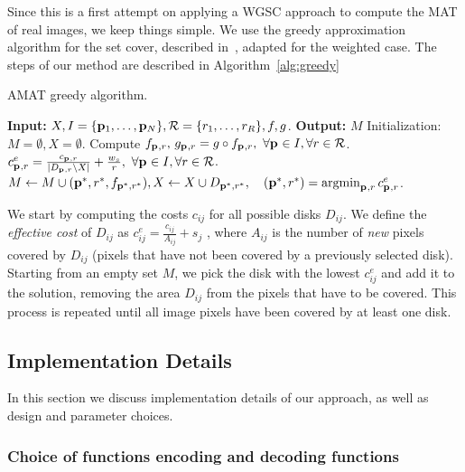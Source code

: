 \documentclass[10pt,twocolumn,letterpaper]{article}
\begin{document}
Since this is a first attempt on applying a WGSC approach to compute the MAT of real images, we keep things simple.
We use the greedy approximation algorithm for the set cover, described in~\cite{vazirani2013approximation},
adapted for the weighted case.
The steps of our method are described in Algorithm~\ref{alg:greedy}
\begin{algorithm}
\caption{AMAT greedy algorithm.}
\label{alg:greedy}
	\begin{algorithmic}[1]
	\Statex \textbf{Input:} $X,I=\{\mathbf{p}_{1},\ldots,\mathbf{p}_{N}\},\mathcal{R}=\{r_1,\ldots,r_R\},f,g$.
	\Statex \textbf{Output:} $M$
	\State Initialization: $M = \emptyset,X=\emptyset$.
	\State Compute $f_{\mathbf{p}_{},r},\, g_{\mathbf{p}_{},r} = g \circ f_{\mathbf{p}_{},r},\,\, \forall \mathbf{p}_{} \in I, \forall r \in \mathcal{R}$.
		\State $c_{\mathbf{p}_{},r}^e = \frac{c_{\mathbf{p}_{},r}}{|D_{\mathbf{p}_{},r} \setminus X|}+\frac{w_s}{r},\,\, \forall \mathbf{p}_{} \in I, \forall r \in \mathcal{R}$.		
		\State $M\leftarrow M\cup{(\p{}^{*},r^{*},f_{\p{}^{*},r^{*}})},  \newline
				X \leftarrow X\cup D_{\p{}^{*},r^{*}}, \quad (\p{}^{*},r^{*}) = \argmin_{\p{},r}{c_{\p{},r}^e}$.		
	\EndWhile
	\end{algorithmic}
\end{algorithm}
We start by computing the costs $c_{ij}$ for all possible disks $D_{ij}$.
We define the \emph{effective cost} of $D_{ij}$ as $c_{ij}^e = \frac{c_{ij}}{A_{ij}} + s_j$ , where $A_{ij}$ is the number
of \emph{new} pixels covered by $D_{ij}$ (pixels that have not been covered by a previously selected disk).
Starting from an empty set $M$, we pick the disk with the lowest $c_{ij}^e$ and add it to the solution, 
removing the area $D_{ij}$ from the pixels that have to be covered.
This process is repeated until all image pixels have been covered by at least one disk.

 
\subsection{Implementation Details}\label{sec:implementation}
In this section we discuss implementation details of our approach, as well as design and parameter choices.
\subsubsection*{Choice of functions encoding and decoding functions}
\end{document}
